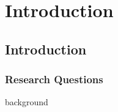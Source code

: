 \chapter{Introduction} \label{ch01}


\section{Introduction}


\subsection{Research Questions}


{background}


